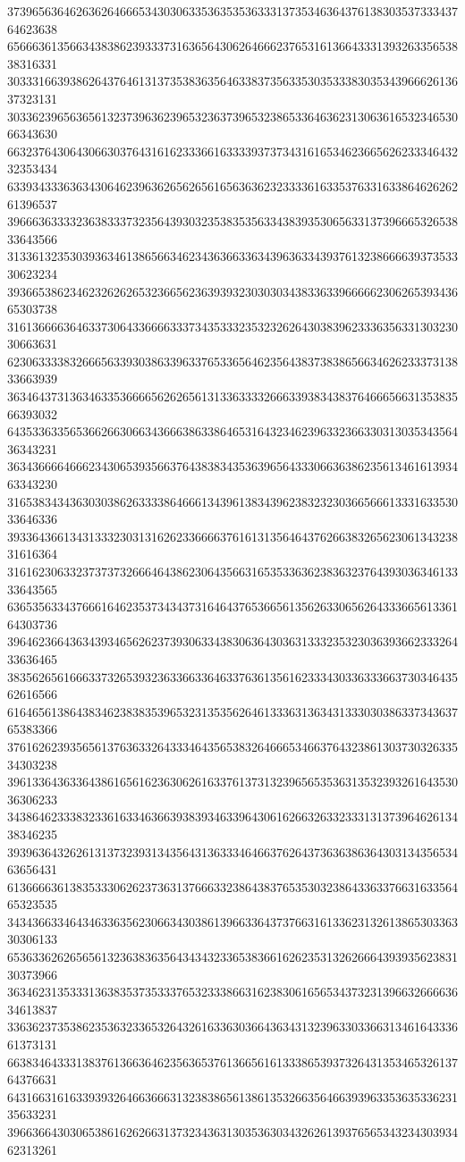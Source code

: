 37396563646263626466653430306335363535363331373534636437613830353733343764623638
65666361356634383862393337316365643062646662376531613664333139326335653838316331
30333166393862643764613137353836356463383735633530353338303534396662613637323131
30336239656365613237396362396532363739653238653364636231306361653234653066343630
66323764306430663037643161623336616333393737343161653462366562623334643232353434
63393433363634306462396362656265616563636232333361633537633163386462626261396537
39666363333236383337323564393032353835356334383935306563313739666532653833643566
31336132353039363461386566346234363663363439636334393761323866663937353330623234
39366538623462326262653236656236393932303030343833633966666230626539343665303738
31613666636463373064336666333734353332353232626430383962333635633130323030663631
62306333383266656339303863396337653365646235643837383865663462623337313833663939
36346437313634633536666562626561313363333266633938343837646665663135383566393032
64353363356536626630663436663863386465316432346239633236633031303534356436343231
36343666646662343065393566376438383435363965643330663638623561346161393463343230
31653834343630303862633338646661343961383439623832323036656661333163353033646336
39336436613431333230313162623366663761613135646437626638326562306134323831616364
31616230633237373732666464386230643566316535336362383632376439303634613333643565
63653563343766616462353734343731646437653665613562633065626433366561336164303736
39646236643634393465626237393063343830636430363133323532303639366233326433636465
38356265616663373265393236336633646337636135616233343033633366373034643562616566
61646561386438346238383539653231353562646133363136343133303038633734363765383366
37616262393565613763633264333464356538326466653466376432386130373032633534303238
39613364363364386165616236306261633761373132396565353631353239326164353036306233
34386462333832336163346366393839346339643061626632633233313137396462613438346235
39396364326261313732393134356431363334646637626437363638636430313435653463656431
61366663613835333062623736313766633238643837653530323864336337663163356465323535
34343663346434633635623066343038613966336437376631613362313261386530336330306133
65363362626565613236383635643434323365383661626235313262666439393562383130373966
36346231353331363835373533376532333866316238306165653437323139663266663634613837
33636237353862353632336532643261633630366436343132396330336631346164333661373131
66383464333138376136636462356365376136656161333865393732643135346532613764376631
64316631616339393264663666313238386561386135326635646639396335363533623135633231
39663664303065386162626631373234363130353630343262613937656534323430393462313261
